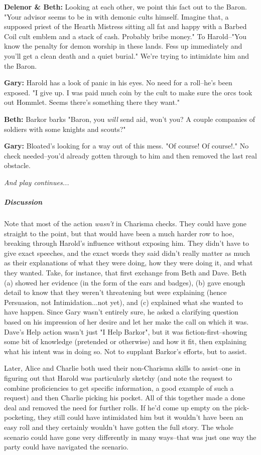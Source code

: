 \textbf{Delenor \& Beth:} Looking at each other, we point this fact out to the Baron. "Your advisor seems to be in with demonic cults himself. Imagine that, a supposed priest of the Hearth Mistress sitting all fat and happy with a Barbed Coil cult emblem and a stack of cash. Probably bribe money." To Harold--"You know the penalty for demon worship in these lands. Fess up immediately and you'll get a clean death and a quiet burial." We're trying to intimidate him and the Baron.

\textbf{Gary:} Harold has a look of panic in his eyes. No need for a roll--he's been exposed. "I give up. I was paid much coin by the cult to make sure the orcs took out Hommlet. Seems there's something there they want."

\textbf{Beth:} Barkor barks "Baron, you \textit{will} send aid, won't you? A couple companies of soldiers with some knights and scouts?"

\textbf{Gary:} Bloated's looking for a way out of this mess. "Of course! Of course!." No check needed--you'd already gotten through to him and then removed the last real obstacle.

\textit{And play continues...}

\subparagraph*{Discussion} Note that most of the action \textit{wasn't} in Charisma checks. They could have gone straight to the point, but that would have been a much harder row to hoe, breaking through Harold's influence without exposing him. They didn't have to give exact speeches, and the exact words they said didn't really matter as much as their explanations of what they were doing, how they were doing it, and what they wanted. Take, for instance, that first exchange from Beth and Dave. Beth (a) showed her evidence (in the form of the ears and badges), (b) gave enough detail to know that they weren't threatening but were explaining (hence Persuasion, not Intimidation...not yet), and (c) explained what she wanted to have happen. Since Gary wasn't entirely sure, he asked a clarifying question based on his impression of her desire and let her make the call on which it was. Dave's Help action wasn't just "I Help Barkor", but it was fiction-first--showing some bit of knowledge (pretended or otherwise) and how it fit, then explaining what his intent was in doing so. Not to supplant Barkor's efforts, but to assist.

Later, Alice and Charlie both used their non-Charisma skills to assist--one in figuring out that Harold was particularly sketchy (and note the request to combine proficiencies to get specific information, a good example of such a request) and then Charlie picking his pocket. All of this together made a done deal and removed the need for further rolls. If he'd come up empty on the pick-pocketing, they still could have intimidated him but it wouldn't have been an easy roll and they certainly wouldn't have gotten the full story. The whole scenario could have gone very differently in many ways--that was just one way the party could have navigated the scenario.


